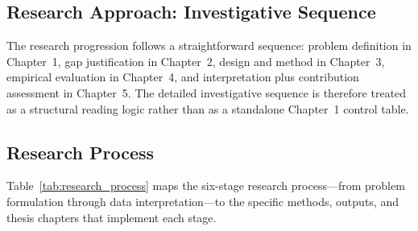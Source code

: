 \subsection{Research Approach: Investigative Sequence}

\noindent The research progression follows a straightforward sequence: problem definition in Chapter~1, gap justification in Chapter~2, design and method in Chapter~3, empirical evaluation in Chapter~4, and interpretation plus contribution assessment in Chapter~5. The detailed investigative sequence is therefore treated as a structural reading logic rather than as a standalone Chapter~1 control table.

\label{tab:research_verbs}

\iffalse
\subsection{Research Process}

Table~\ref{tab:research_process} maps the six-stage research process---from problem formulation through data interpretation---to the specific methods, outputs, and thesis chapters that implement each stage.


